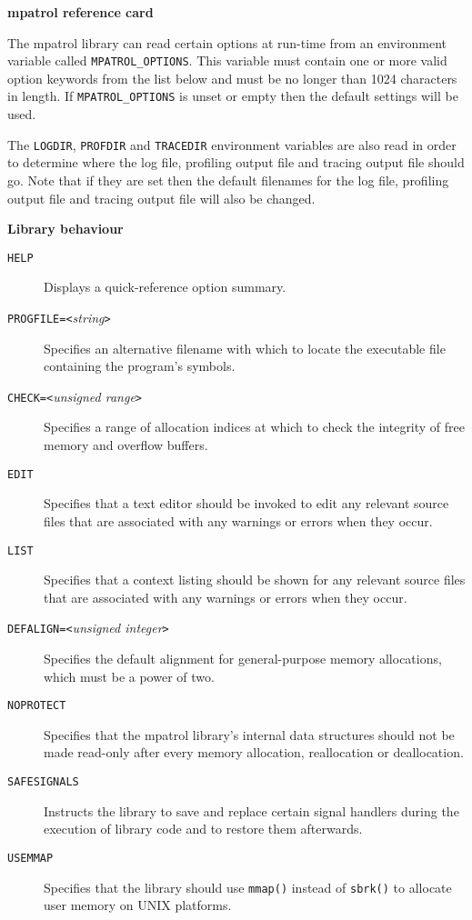 \documentclass[a4paper,landscape,final]{article}
\newcommand{\heading}[1]{\textbf{\normalsize #1}}
\newcommand{\function}[1]{\texttt{#1()}}
\newcommand{\option}[1]{\texttt{#1}}
\newcommand{\optionpar}[2]{\option{#1}\texttt{=<}\textit{#2}\texttt{>}}
\begin{document}
\pagestyle{empty}

\footnotesize

\begin{multicols}{3}{\textbf{\Large mpatrol reference card}}

\vskip 12pt

The mpatrol library can read certain options at run-time from an environment
variable called \texttt{MPATROL\_OPTIONS}.  This variable must contain one or
more valid option keywords from the list below and must be no longer than 1024
characters in length.  If \texttt{MPATROL\_OPTIONS} is unset or empty then the
default settings will be used.

The \texttt{LOGDIR}, \texttt{PROFDIR} and \texttt{TRACEDIR} environment
variables are also read in order to determine where the log file, profiling
output file and tracing output file should go.  Note that if they are set then
the default filenames for the log file, profiling output file and tracing output
file will also be changed.

\vskip 12pt
\heading{Library behaviour}
\vskip 6pt

\begin{description}
\item[\option{HELP}]
Displays a quick-reference option summary.
\item[\optionpar{PROGFILE}{string}]
Specifies an alternative filename with which to locate the executable file
containing the program's symbols.
\item[\optionpar{CHECK}{unsigned range}]
Specifies a range of allocation indices at which to check the integrity of free
memory and overflow buffers.
\item[\option{EDIT}]
Specifies that a text editor should be invoked to edit any relevant source files
that are associated with any warnings or errors when they occur.
\item[\option{LIST}]
Specifies that a context listing should be shown for any relevant source files
that are associated with any warnings or errors when they occur.
\item[\optionpar{DEFALIGN}{unsigned integer}]
Specifies the default alignment for general-purpose memory allocations, which
must be a power of two.
\item[\option{NOPROTECT}]
Specifies that the mpatrol library's internal data structures should not be made
read-only after every memory allocation, reallocation or deallocation.
\item[\option{SAFESIGNALS}]
Instructs the library to save and replace certain signal handlers during the
execution of library code and to restore them afterwards.
\item[\option{USEMMAP}]
Specifies that the library should use \function{mmap} instead of \function{sbrk}
to allocate user memory on UNIX platforms.
\end{description}


\end{multicols}
\end{document}
